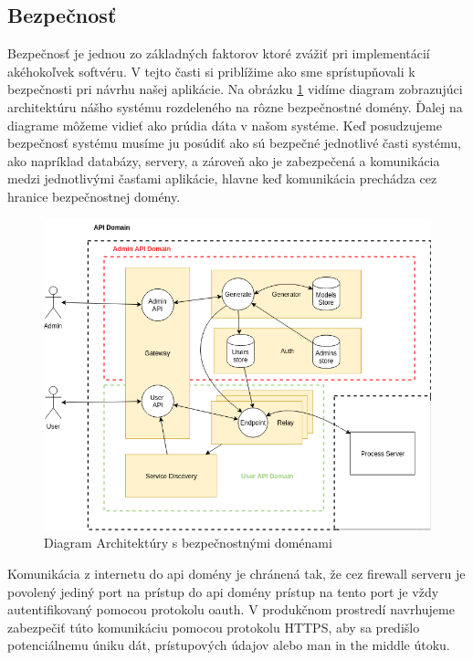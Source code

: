 \subsection{Bezpečnosť}
Bezpečnosť je jednou zo základných faktorov ktoré zvážiť pri implementácií akéhokoľvek softvéru. V tejto časti si priblížime ako sme sprístupňovali k bezpečnosti pri návrhu našej aplikácie.  Na obrázku \ref{threat_analysis} vidíme diagram zobrazujúci architektúru nášho systému rozdeleného na rôzne bezpečnostné domény. Ďalej na diagrame môžeme vidieť ako prúdia dáta v našom systéme.  Keď posudzujeme bezpečnosť systému musíme ju posúdiť ako sú bezpečné jednotlivé časti systému, ako napríklad databázy, servery, a zároveň ako je zabezpečená a komunikácia medzi jednotlivými časťami aplikácie, hlavne keď komunikácia prechádza cez hranice bezpečnostnej domény.  

\begin{figure}[!htbp]
	\centering
	\includegraphics[width=13cm]{img/threat_analysis.png}
	\caption{Diagram Architektúry s bezpečnostnými doménami}
	\label{threat_analysis}
\end{figure}

Komunikácia z internetu do \acrshort{api} domény je chránená tak, že cez firewall serveru je povolený jediný port na prístup do \acrshort{api} domény prístup na tento port je vždy autentifikovaný pomocou protokolu \acrshort{oauth}. V produkčnom prostredí navrhujeme zabezpečiť túto komunikáciu pomocou protokolu HTTPS, aby sa predišlo potenciálnemu úniku dát, prístupových údajov alebo man in the middle útoku. 

